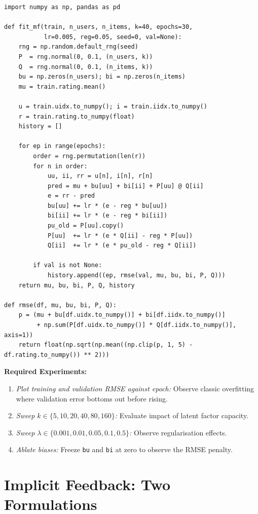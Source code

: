\documentclass[12pt,a4paper]{article}
\begin{document}
\begin{verbatim}
import numpy as np, pandas as pd

def fit_mf(train, n_users, n_items, k=40, epochs=30,
           lr=0.005, reg=0.05, seed=0, val=None):
    rng = np.random.default_rng(seed)
    P  = rng.normal(0, 0.1, (n_users, k))
    Q  = rng.normal(0, 0.1, (n_items, k))
    bu = np.zeros(n_users); bi = np.zeros(n_items)
    mu = train.rating.mean()

    u = train.uidx.to_numpy(); i = train.iidx.to_numpy()
    r = train.rating.to_numpy(float)
    history = []

    for ep in range(epochs):
        order = rng.permutation(len(r))
        for n in order:
            uu, ii, rr = u[n], i[n], r[n]
            pred = mu + bu[uu] + bi[ii] + P[uu] @ Q[ii]
            e = rr - pred
            bu[uu] += lr * (e - reg * bu[uu])
            bi[ii] += lr * (e - reg * bi[ii])
            pu_old = P[uu].copy()
            P[uu]  += lr * (e * Q[ii] - reg * P[uu])
            Q[ii]  += lr * (e * pu_old - reg * Q[ii])

        if val is not None:
            history.append((ep, rmse(val, mu, bu, bi, P, Q)))
    return mu, bu, bi, P, Q, history

def rmse(df, mu, bu, bi, P, Q):
    p = (mu + bu[df.uidx.to_numpy()] + bi[df.iidx.to_numpy()]
         + np.sum(P[df.uidx.to_numpy()] * Q[df.iidx.to_numpy()], axis=1))
    return float(np.sqrt(np.mean((np.clip(p, 1, 5) - df.rating.to_numpy()) ** 2)))
\end{verbatim}

\textbf{Required Experiments:}
\begin{enumerate}
    \item \emph{Plot training and validation RMSE against epoch:} Observe classic overfitting where validation error bottoms out before rising.
    \item \emph{Sweep $k \in \{5,10,20,40,80,160\}$:} Evaluate impact of latent factor capacity.
    \item \emph{Sweep $\lambda \in \{0.001, 0.01, 0.05, 0.1, 0.5\}$:} Observe regularisation effects.
    \item \emph{Ablate biases:} Freeze \texttt{bu} and \texttt{bi} at zero to observe the RMSE penalty.
\end{enumerate}

\section{Implicit Feedback: Two Formulations}
\end{document}
